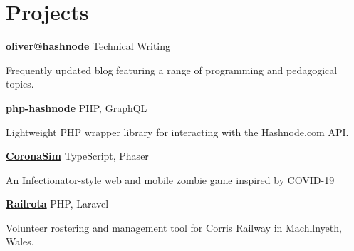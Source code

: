 \section{Projects}

\parbox[t][][t]{\linewidth}{
	\parbox{\linewidth}{\textbf{\href{https://blog.oliverearl.co.uk}{oliver@hashnode}} \hfill {{Technical Writing}}}
	\parbox{\linewidth}{Frequently updated blog featuring a range of programming and pedagogical topics.}
	\smallskip
}

\parbox[t][][t]{\linewidth}{
	\parbox{\linewidth}{\textbf{\href{https://www.github.com/oliverearl/php-hashnode}{php-hashnode}} \hfill {{PHP, GraphQL}}}
	\parbox{\linewidth}{Lightweight PHP wrapper library for interacting with the Hashnode.com API.}
	\smallskip
}

\parbox[t][][t]{\linewidth}{
	\parbox{\linewidth}{\textbf{\href{https://www.github.com/oliverearl/corona-simulator}{CoronaSim}} \hfill {{TypeScript, Phaser}}}
	\parbox{\linewidth}{An Infectionator-style web and mobile zombie game inspired by COVID-19}
	\smallskip
}

\parbox[t][][t]{\linewidth}{
	\parbox{\linewidth}{\textbf{\href{https://www.github.com/oliverearl/railrota}{Railrota}} \hfill {{PHP, Laravel}}}
	\parbox{\linewidth}{Volunteer rostering and management tool for Corris Railway in Machllnyeth, Wales.}
	\smallskip
}